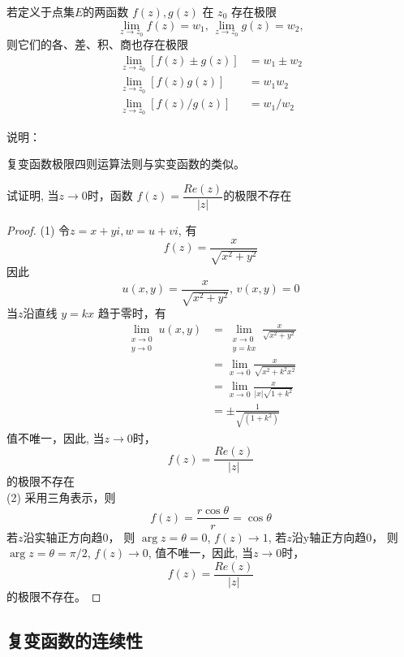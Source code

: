 \begin{theorem}\label{} \index{}
    若定义于点集$E$的两函数 $f(z), g(z)$ 在 $z_0$ 存在极限
	  \[\lim_{z \to z_0} f(z) = w_{1}, \, \lim_{z \to z_0} g(z) = w_{2}, \]
	  则它们的各、差、积、商也存在极限
	  \[ \begin{aligned}
		 \lim\limits_{z \to z_0} [f(z) \pm g(z)] &= w_{1} \pm w_{2} \\
		 \lim\limits_{z \to z_0} [f(z)g(z)] &= w_{1}w_{2} \\
			\lim\limits_{z \to z_0} [f(z)/g(z)] &= w_{1}/w_{2} 
	  \end{aligned}\]
\end{theorem}
说明：\begin{compactitem}
    \item 复变函数极限四则运算法则与实变函数的类似。
\end{compactitem}
\begin{example}
    试证明, 当$z\to 0$时，函数 $f(z) = \dfrac{Re(z)}{\left\vert z\right\vert}$的极限不存在
\end{example}
\begin{proof}
    (1) 令$z = x + y i, w = u + v i$, 有 
    \[f(z) = \frac{x}{\sqrt{x^2 + y^2}} \]
    因此 
    \[ u(x,y) = \frac{x}{\sqrt{x^2 + y^2}}, \, v(x,y) =0\]
    当$z$沿直线 $y= k x $ 趋于零时，有 
    \[ \begin{aligned}
     \lim _{\substack{x \rightarrow 0 \\ y \rightarrow 0}} u(x, y) &=\lim _{\substack{x \rightarrow 0 \\ y =  k x}}  \frac{x}{\sqrt{x^2 + y^2}} \\
     &= \lim_{x \to 0} \frac{x}{\sqrt{x^2 + k^2x^2}} \\
     &= \lim_{x \to 0} \frac{x}{ \left\vert x\right\vert\sqrt{1+ k^2}} \\
     &= \pm \frac{1}{\sqrt{(1+ k^2)}} 
    \end{aligned}\]
    值不唯一，因此, 当$z\to 0$时，  
    $$f(z) = \frac{Re(z)}{\left\vert z\right\vert}$$的极限不存在 \\
    (2) 采用三角表示，则
    \[ f(z) = \frac{r \cos \theta }{r} = \cos \theta \]
    若$z$沿实轴正方向趋0， 则 $\arg z = \theta =0$, $f(z) \to 1$, 
    若$z$沿y轴正方向趋0， 则 $\arg z = \theta =\pi/2$, $f(z) \to 0$,
    值不唯一，因此, 当$z\to 0$时， 
    $$f(z) = \frac{Re(z)}{\left\vert z\right\vert}$$的极限不存在。
\end{proof}

\subsection{复变函数的连续性}~\\

